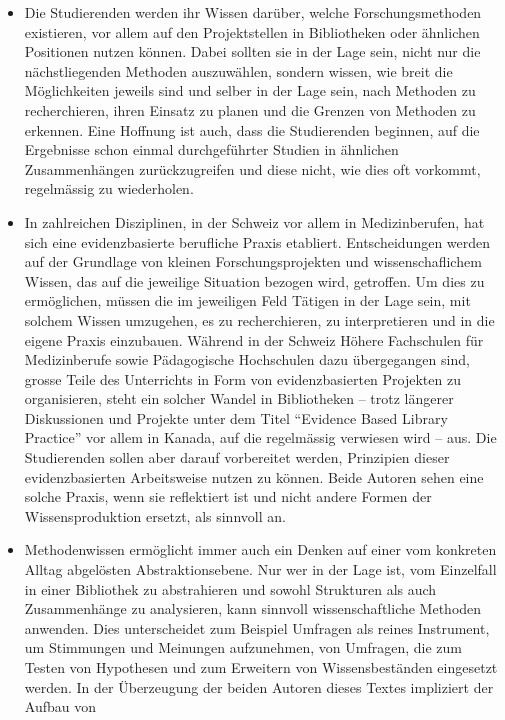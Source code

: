 \documentclass[a4paper,
fontsize=11pt,
oneside,
numbers=noperiodatend,
parskip=half-,
bibliography=totoc,
final
]{scrartcl}
\begin{document}
\begin{itemize}
\item
  Die Studierenden werden ihr Wissen darüber, welche Forschungsmethoden
  existieren, vor allem auf den Projektstellen in Bibliotheken oder
  ähnlichen Positionen nutzen können. Dabei sollten sie in der Lage
  sein, nicht nur die nächstliegenden Methoden auszuwählen, sondern
  wissen, wie breit die Möglichkeiten jeweils sind und selber in der
  Lage sein, nach Methoden zu recherchieren, ihren Einsatz zu planen und
  die Grenzen von Methoden zu erkennen. Eine Hoffnung ist auch, dass die
  Studierenden beginnen, auf die Ergebnisse schon einmal durchgeführter
  Studien in ähnlichen Zusammenhängen zurückzugreifen und diese nicht,
  wie dies oft vorkommt, regelmässig zu wiederholen.
\item
  In zahlreichen Disziplinen, in der Schweiz vor allem in
  Medizinberufen, hat sich eine evidenzbasierte berufliche Praxis
  etabliert. Entscheidungen werden auf der Grundlage von kleinen
  Forschungsprojekten und wissenschaflichem Wissen, das auf die
  jeweilige Situation bezogen wird, getroffen. Um dies zu ermöglichen,
  müssen die im jeweiligen Feld Tätigen in der Lage sein, mit solchem
  Wissen umzugehen, es zu recherchieren, zu interpretieren und in die
  eigene Praxis einzubauen. Während in der Schweiz Höhere Fachschulen
  für Medizinberufe sowie Pädagogische Hochschulen dazu übergegangen
  sind, grosse Teile des Unterrichts in Form von evidenzbasierten
  Projekten zu organisieren, steht ein solcher Wandel in Bibliotheken --
  trotz längerer Diskussionen und Projekte unter dem Titel
  \enquote{Evidence Based Library Practice} vor allem in Kanada, auf die
  regelmässig verwiesen wird -- aus. Die Studierenden sollen aber darauf
  vorbereitet werden, Prinzipien dieser evidenzbasierten Arbeitsweise
  nutzen zu können. Beide Autoren sehen eine solche Praxis, wenn sie
  reflektiert ist und nicht andere Formen der Wissensproduktion ersetzt,
  als sinnvoll an.
\item
  Methodenwissen ermöglicht immer auch ein Denken auf einer vom
  konkreten Alltag abgelösten Abstraktionsebene. Nur wer in der Lage
  ist, vom Einzelfall in einer Bibliothek zu abstrahieren und sowohl
  Strukturen als auch Zusammenhänge zu analysieren, kann sinnvoll
  wissenschaftliche Methoden anwenden. Dies unterscheidet zum Beispiel
  Umfragen als reines Instrument, um Stimmungen und Meinungen
  aufzunehmen, von Umfragen, die zum Testen von Hypothesen und zum
  Erweitern von Wissensbeständen eingesetzt werden. In der Überzeugung
  der beiden Autoren dieses Textes impliziert der Aufbau von

\end{itemize}
\end{document}
